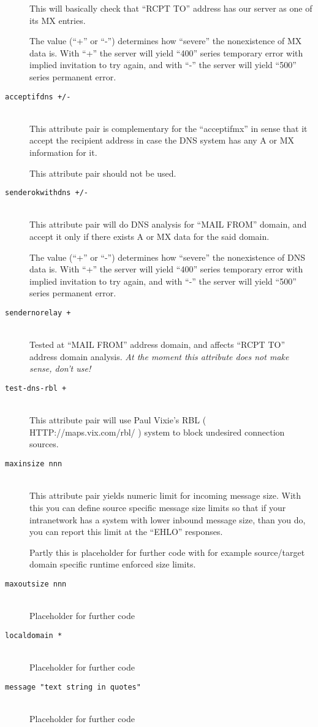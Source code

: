 \begin{description}
This will basically check that ``RCPT TO'' address has our server
as one of its MX entries.

The value (``+'' or ``-'') determines how ``severe'' the nonexistence
of MX data is.  With ``+'' the server will yield ``400'' series temporary
error with implied invitation to try again, and with ``-'' the server will
yield ``500'' series permanent error.

\item[\tt acceptifdns +/-] \mbox{} \\
This attribute pair is complementary for the ``acceptifmx'' in sense
that it accept the recipient address in case the DNS system has any
A or MX information for it.

This attribute pair should not be used.

\item[\tt senderokwithdns +/-] \mbox{} \\
This attribute pair will do DNS analysis for ``MAIL FROM'' domain, and
accept it only if there exists A or MX data for the said domain.

The value (``+'' or ``-'') determines how ``severe'' the nonexistence
of DNS data is.  With ``+'' the server will yield ``400'' series temporary
error with implied invitation to try again, and with ``-'' the server will
yield ``500'' series permanent error.


\item[\tt sendernorelay +] \mbox{} \\
Tested at ``MAIL FROM'' address domain, and affects ``RCPT TO''
address domain analysis.
{\em At the moment this attribute does not make sense, don't use!}

\item[\tt test-dns-rbl +] \mbox{} \\
This attribute pair will use Paul Vixie's RBL
( HTTP://maps.vix.com/rbl/ )
system to block undesired connection sources.

\item[\tt maxinsize nnn] \mbox{} \\
This attribute pair yields numeric limit for incoming message
size.  With this you can define source specific message size
limits so that if your intranetwork has a system with lower
inbound message size, than you do, you can report this limit
at the ``EHLO'' responses.

Partly this is placeholder for further code with for example
source/target domain specific runtime enforced size limits.

\item[\tt maxoutsize nnn] \mbox{} \\
Placeholder for further code

\item[\tt localdomain *] \mbox{} \\
Placeholder for further code

\item[\tt message "text string in quotes"] \mbox{} \\
Placeholder for further code
\end{description}

